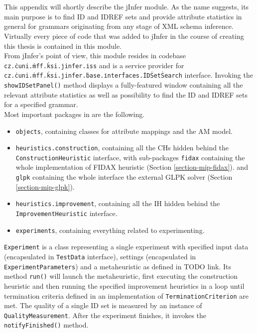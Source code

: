 \chapter{}
\label{appendix-iss}


This appendix will shortly describe the  jInfer module. As the name suggests, its main purpose is to find ID and IDREF sets and provide attribute statistics in general for grammars originating from any stage of XML schema inference. Virtually every piece of code that was added to jInfer in the course of creating this thesis is contained in this module.\\

From jInfer's point of view, this module resides in codebase \texttt{cz.\.cuni.\.mff.\.ksi.\.jinfer.\.iss} and is a service provider for \texttt{cz.\.cuni.\.mff.\.ksi.\.jinfer.\.base.\.inter\.faces.\.ID\.Set\.Search} interface. Invoking the \texttt{showIDSetPanel()} method displays a fully-featured window containing all the relevant attribute statistics as well as possibility to find the ID and IDREF sets for a specified grammar.\\

Most important packages in  are the following.

\begin{itemize}
	\item \texttt{objects}, containing classes for attribute mappings and the AM model.
	\item \texttt{heuristics.construction}, containing all the CHs hidden behind the \texttt{Con\-struc\-tion\-Heu\-ris\-tic} interface, with sub-packages \texttt{fidax} containing the whole implementation of FIDAX heuristic (Section \ref{section-mip-fidax}).
	and \texttt{glpk} containing the whole interface the external GLPK solver (Section \ref{section-mip-glpk}).
	\item \texttt{heuristics.improvement}, containing all the IH hidden behind the \texttt{Im\-prove\-ment\-Heu\-ris\-tic} interface.
	\item \texttt{experiments}, containing everything related to experimenting.
\end{itemize}

\texttt{Experiment} is a class representing a single experiment with specified input data (encapsulated in \texttt{Test\-Data} interface), settings (encapsulated in \texttt{Ex\-pe\-ri\-ment\-Pa\-ra\-me\-ters}) and a metaheuristic as defined in TODO link. Its method \texttt{run()} will launch the metaheuristic, first executing the construction heuristic and then running the specified improvement heuristics in a loop until termination criteria defined in an implementation of \texttt{Ter\-mi\-na\-tion\-Cri\-ter\-ion} are met. The quality of a single ID set is measured by an instance of \texttt{Quality\-Measurement}. After the experiment finishes, it invokes the \texttt{notify\-Finished()} method.

